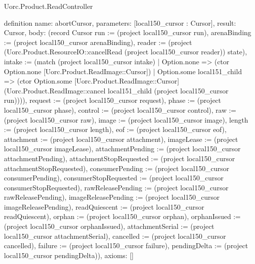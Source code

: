\begin{lexlean}{Uorc.Product.ReadController}
\begin{semanticmodule}
definition{
  name: abortCursor,
  parameters: [local150_cursor : Cursor],
  result: Cursor,
  body: (record Cursor {run := (project local150_cursor run), arenaBinding := (project local150_cursor arenaBinding), reader := (project (Uorc.Product.ResourceIO::cancelRead (project local150_cursor reader)) state), intake := (match (project local150_cursor intake)
    | Option.none => (ctor Option.none [Uorc.Product.ReadImage::Cursor])
    | Option.some local151_child => (ctor Option.some [Uorc.Product.ReadImage::Cursor] (Uorc.Product.ReadImage::cancel local151_child (project local150_cursor run)))), request := (project local150_cursor request), phase := (project local150_cursor phase), control := (project local150_cursor control), raw := (project local150_cursor raw), image := (project local150_cursor image), length := (project local150_cursor length), eof := (project local150_cursor eof), attachment := (project local150_cursor attachment), imageLease := (project local150_cursor imageLease), attachmentPending := (project local150_cursor attachmentPending), attachmentStopRequested := (project local150_cursor attachmentStopRequested), consumerPending := (project local150_cursor consumerPending), consumerStopRequested := (project local150_cursor consumerStopRequested), rawReleasePending := (project local150_cursor rawReleasePending), imageReleasePending := (project local150_cursor imageReleasePending), readQuiescent := (project local150_cursor readQuiescent), orphan := (project local150_cursor orphan), orphanIssued := (project local150_cursor orphanIssued), attachmentSerial := (project local150_cursor attachmentSerial), cancelled := (project local150_cursor cancelled), failure := (project local150_cursor failure), pendingDelta := (project local150_cursor pendingDelta)}),
  axioms: []
}


\end{semanticmodule}
\end{lexlean}
